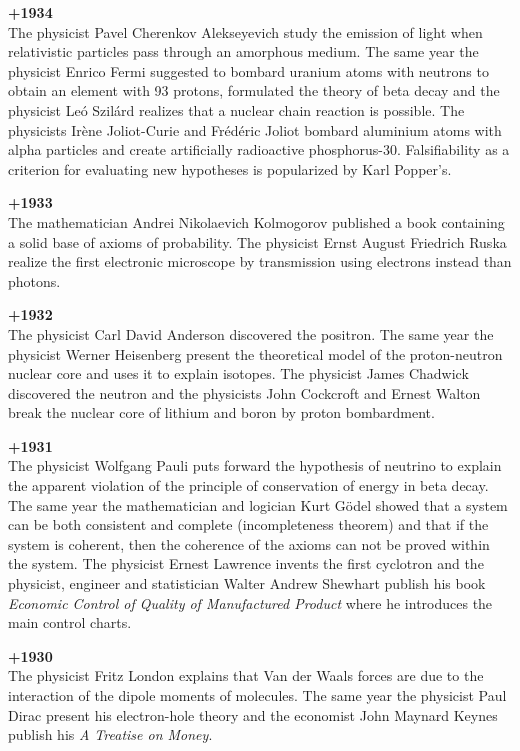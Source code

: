 \textbf{+1934}\\
The physicist Pavel Cherenkov Alekseyevich study the emission of light when relativistic particles pass through an amorphous medium. The same year the physicist Enrico Fermi suggested to bombard uranium atoms with neutrons to obtain an element with 93 protons, formulated the theory of beta decay and the physicist Leó Szilárd realizes that a nuclear chain reaction is possible. The physicists Irène Joliot-Curie and Frédéric Joliot bombard aluminium atoms with alpha particles and create artificially radioactive phosphorus-30. Falsifiability as a criterion for evaluating new hypotheses is popularized by Karl Popper's.

\textbf{+1933}\\
The mathematician Andrei Nikolaevich Kolmogorov published a book containing a solid base of axioms of probability. The physicist Ernst August Friedrich Ruska realize the first electronic microscope by transmission using electrons instead than photons.

\textbf{+1932}\\
The physicist Carl David Anderson discovered the positron. The same year the physicist Werner Heisenberg present the theoretical model of the proton-neutron nuclear core and uses it to explain isotopes. The physicist James Chadwick discovered the neutron and the physicists John Cockcroft and Ernest Walton break the nuclear core of lithium and boron by proton bombardment.

\textbf{+1931}\\
The physicist Wolfgang Pauli puts forward the hypothesis of neutrino to explain the apparent violation of the principle of conservation of energy in beta decay. The same year the mathematician and logician Kurt Gödel showed that a system can be both consistent and complete (incompleteness theorem) and that if the system is coherent, then the coherence of the axioms can not be proved within the system. The physicist Ernest Lawrence invents the first cyclotron and the physicist, engineer and statistician Walter Andrew Shewhart publish his book \textit{Economic Control of Quality of Manufactured Product} where he introduces the main control charts.

\textbf{+1930}\\
The physicist Fritz London explains that Van der Waals forces are due to the interaction of the dipole moments of molecules. The same year the physicist Paul Dirac present his electron-hole theory and the economist John Maynard Keynes publish his \textit{A Treatise on Money}.

